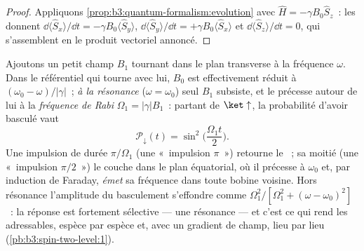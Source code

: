 \begin{proof}
Appliquons \cref{prop:b3:quantum-formalism:evolution} avec $\hat H =
-\gamma B_0\hat S_z$~: les  donnent $\dd\langle\hat
S_x\rangle/\dd t = -\gamma B_0\langle\hat S_y\rangle$,
$\dd\langle\hat S_y\rangle/\dd t = +\gamma B_0\langle\hat
S_x\rangle$ et $\dd\langle\hat S_z\rangle/\dd t = 0$, qui
s'assemblent en le produit vectoriel annoncé.
\end{proof}

\begin{proposition}\label{prop:b3:spin-two-level:rabi}
Ajoutons un petit champ $B_1$ tournant dans le plan transverse à la
fréquence $\omega$. Dans le référentiel qui tourne avec lui, $B_0$ est
effectivement réduit à $(\omega_0 - \omega)/|\gamma|$~; \emph{à la
résonance} ($\omega = \omega_0$) seul $B_1$ subsiste, et le 
précesse autour de lui à la \emph{fréquence de Rabi} $\Omega_1 =
|\gamma|B_1$~: partant de $\ket\uparrow$, la probabilité d'avoir
basculé vaut
\[
\mathcal P_\downarrow(t) = \sin^2\Big(\frac{\Omega_1t}{2}\Big) .
\]
Une impulsion de durée $\pi/\Omega_1$ (une «~impulsion $\pi$~»)
retourne le ~; sa moitié (une «~impulsion $\pi/2$~») le couche
dans le plan équatorial, où il précesse à $\omega_0$ et, par induction
de Faraday, \emph{émet} sa fréquence dans toute bobine voisine. Hors
résonance l'amplitude du basculement s'effondre comme $\Omega_1^2/[\Omega_1^2 +
(\omega - \omega_0)^2]$~: la réponse est fortement sélective --- une
résonance --- et c'est ce qui rend les  adressables, espèce par
espèce et, avec un gradient de champ, lieu par lieu
(\cref{pb:b3:spin-two-level:1}).
\end{proposition}
\admitted

